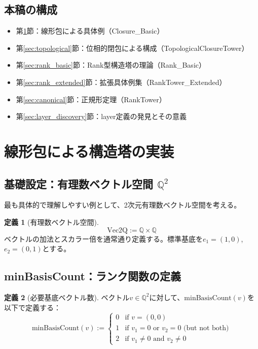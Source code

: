 \documentclass[a4paper,12pt]{ltjsarticle}
\theoremstyle{definition}
\newtheorem{definition}{定義}[section]
\begin{document}
\subsection{本稿の構成}

\begin{itemize}
\item 第\ref{sec:closure}節：線形包による具体例（Closure\_Basic）
\item 第\ref{sec:topological}節：位相的閉包による構成（TopologicalClosureTower）
\item 第\ref{sec:rank_basic}節：Rank型構造塔の理論（Rank\_Basic）
\item 第\ref{sec:rank_extended}節：拡張具体例集（RankTower\_Extended）
\item 第\ref{sec:canonical}節：正規形定理（RankTower）
\item 第\ref{sec:layer_discovery}節：layer定義の発見とその意義
\end{itemize}

\section{線形包による構造塔の実装}\label{sec:closure}

\subsection{基礎設定：有理数ベクトル空間 $\mathbb{Q}^2$}

最も具体的で理解しやすい例として、2次元有理数ベクトル空間を考える。

\begin{definition}[有理数ベクトル空間]
$$\text{Vec2Q} := \mathbb{Q} \times \mathbb{Q}$$
ベクトルの加法とスカラー倍を通常通り定義する。標準基底を$e_1 = (1,0)$, $e_2 = (0,1)$とする。
\end{definition}

\subsection{minBasisCount：ランク関数の定義}

\begin{definition}[必要基底ベクトル数]
ベクトル$v \in \mathbb{Q}^2$に対して、$\text{minBasisCount}(v)$を以下で定義する：
$$\text{minBasisCount}(v) := \begin{cases}
0 & \text{if } v = (0,0) \\
1 & \text{if } v_1 = 0 \text{ or } v_2 = 0 \text{ (but not both)} \\
2 & \text{if } v_1 \neq 0 \text{ and } v_2 \neq 0
\end{cases}$$
\end{definition}
\end{document}
